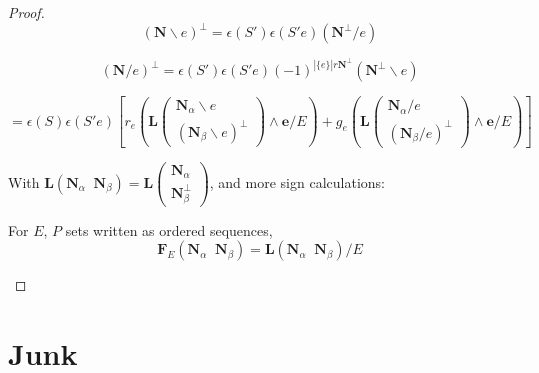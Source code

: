 \documentclass[Unicode]{cedram-alco}
\newcommand{\ext}[1]{\ensuremath{\mathbf{#1}}}
\newcommand{\eNal}{\ensuremath{\ext{N}_{\alpha}}}
\newcommand{\eNbePe}{\ensuremath{\ext{N}_{\beta}^{\perp}}}
\newcommand{\eNbe}{\ensuremath{\ext{N}_\beta}}
\begin{document}
\begin{proof}


\[{(\ext{N}\backslash e)^\perp = \epsilon(S')\epsilon(S'e)(\ext{N}^\perp/e)}\]


\[{(\ext{N}/e)^\perp = \epsilon(S')\epsilon(S'e)(-1)^{|\{e\}|r\ext{N}^\perp}(\ext{N}^\perp\backslash e)}\]
         






\[
= \epsilon(S)\epsilon(S'e)
\left[
        r_e\left(\ext{L}\left(
        \begin{array}{c} \eNal\backslash e \\
    (\eNbe\backslash e)^\perp
    \end{array}
    \right)  \wedge \ext{e} /E \right)
+
        g_e\left(\ext{L}\left(
        \begin{array}{c} \eNal / e \\
    (\eNbe / e)^\perp \end{array} \right) \wedge \ext{e} /E \right)
\right]
\]







  With $\ext{L}(\eNal\;\; \eNbe)=\ext{L}\left(\begin{array}{c}\eNal \\ \eNbePe \end{array} \right)$, and more sign calculations:
    \begin{defi}
      For $E$, $P$ sets written as ordered sequences,
      \[
      \ext{F}_E(\eNal\;\;\eNbe) = \ext{L}(\eNal\;\;\eNbe)/E
      \]
    \end{defi}


\end{proof}



\section{Junk}
\end{document}
